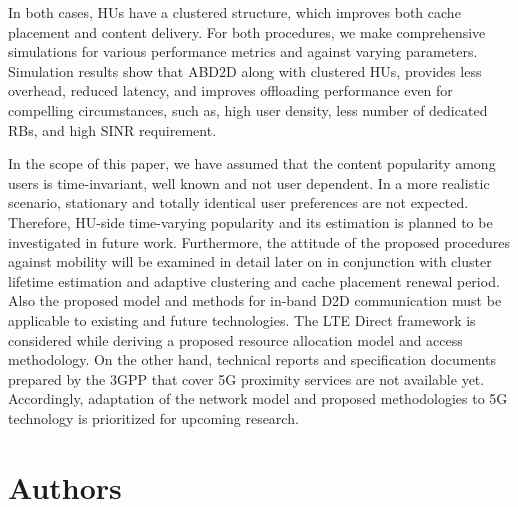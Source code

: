 \documentclass[10pt,a4paper,twocolumn]{article}
\begin{document}
In both cases, HUs have a clustered structure, which improves both cache placement and content delivery.  For both procedures, we make comprehensive simulations for various performance metrics and against varying parameters. Simulation results show that ABD2D along with clustered HUs, provides less overhead, reduced latency, and improves offloading performance even for compelling circumstances, such as, high user density, less number of dedicated RBs, and high SINR requirement.

In the scope of this paper, we have assumed that the content popularity among users is time-invariant, well known and not user dependent. In a more realistic scenario, stationary and totally identical user preferences are not expected. Therefore, HU-side time-varying popularity and its estimation is planned to be investigated in future work. Furthermore, the attitude of the proposed procedures against mobility will be examined in detail later on in conjunction with cluster lifetime estimation and adaptive clustering and cache placement renewal period. Also the  proposed model and methods for in-band D2D communication must be applicable to existing and future technologies. The LTE Direct framework is considered while deriving a proposed resource allocation model and access methodology. On the other hand, technical reports and specification documents prepared by the 3GPP that cover 5G proximity services are not available yet. Accordingly, adaptation of the network model and proposed methodologies to 5G technology is prioritized for upcoming research.


\printbibliography

\pagebreak

\section*{Authors}
\label{sec:auth}
\end{document}
